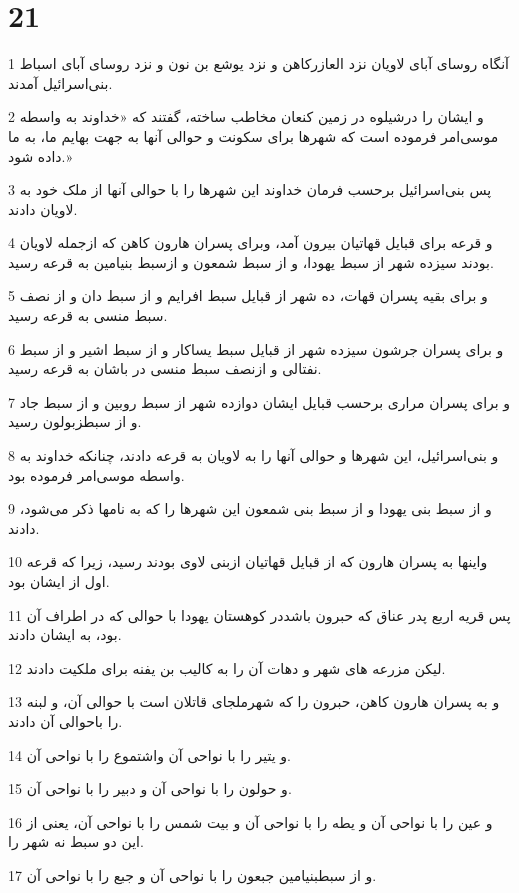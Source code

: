 \chapter{21}

\par 1 آنگاه روسای آبای لاویان نزد العازرکاهن و نزد یوشع بن نون و نزد روسای آبای اسباط بنی‌اسرائیل آمدند.
\par 2 و ایشان را درشیلوه در زمین کنعان مخاطب ساخته، گفتند که «خداوند به واسطه موسی‌امر فرموده است که شهرها برای سکونت و حوالی آنها به جهت بهایم ما، به ما داده شود.»
\par 3 پس بنی‌اسرائیل برحسب فرمان خداوند این شهرها را با حوالی آنها از ملک خود به لاویان دادند.
\par 4 و قرعه برای قبایل قهاتیان بیرون آمد، وبرای پسران هارون کاهن که از‌جمله لاویان بودند سیزده شهر از سبط یهودا، و از سبط شمعون و ازسبط بنیامین به قرعه رسید.
\par 5 و برای بقیه پسران قهات، ده شهر از قبایل سبط افرایم و از سبط دان و از نصف سبط منسی به قرعه رسید.
\par 6 و برای پسران جرشون سیزده شهر از قبایل سبط یساکار و از سبط اشیر و از سبط نفتالی و ازنصف سبط منسی در باشان به قرعه رسید.
\par 7 و برای پسران مراری برحسب قبایل ایشان دوازده شهر از سبط روبین و از سبط جاد و از سبطزبولون رسید.
\par 8 و بنی‌اسرائیل، این شهرها و حوالی آنها را به لاویان به قرعه دادند، چنانکه خداوند به واسطه موسی‌امر فرموده بود.
\par 9 و از سبط بنی یهودا و از سبط بنی شمعون این شهرها را که به نامها ذکر می‌شود، دادند.
\par 10 واینها به پسران هارون که از قبایل قهاتیان ازبنی لاوی بودند رسید، زیرا که قرعه اول از ایشان بود.
\par 11 پس قریه اربع پدر عناق که حبرون باشددر کوهستان یهودا با حوالی که در اطراف آن بود، به ایشان دادند.
\par 12 لیکن مزرعه های شهر و دهات آن را به کالیب بن یفنه برای ملکیت دادند.
\par 13 و به پسران هارون کاهن، حبرون را که شهرملجای قاتلان است با حوالی آن، و لبنه را باحوالی آن دادند.
\par 14 و یتیر را با نواحی آن واشتموع را با نواحی آن.
\par 15 و حولون را با نواحی آن و دبیر را با نواحی آن.
\par 16 و عین را با نواحی آن و یطه را با نواحی آن و بیت شمس را با نواحی آن، یعنی از این دو سبط نه شهر را.
\par 17 و از سبطبنیامین جبعون را با نواحی آن و جبع را با نواحی آن.
